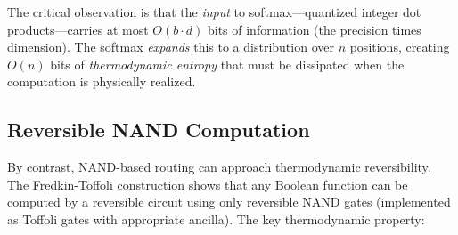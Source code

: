 The critical observation is that the \emph{input} to softmax—quantized integer dot products—carries at most $O(b \cdot d)$ bits of information (the precision times dimension). The softmax \emph{expands} this to a distribution over $n$ positions, creating $O(n)$ bits of \emph{thermodynamic entropy} that must be dissipated when the computation is physically realized.













\subsection{Reversible NAND Computation}













By contrast, NAND-based routing can approach thermodynamic reversibility. The Fredkin-Toffoli construction \cite{fredkin1982} shows that any Boolean function can be computed by a reversible circuit using only reversible NAND gates (implemented as Toffoli gates with appropriate ancilla). The key thermodynamic property:













